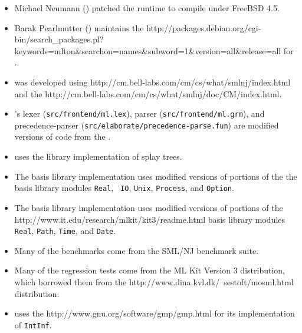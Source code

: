 \begin{itemize}
\item
Michael Neumann () patched the runtime to
compile under FreeBSD 4.5.

\item
Barak Pearlmutter () maintains the
		  {http://packages.debian.org/cgi-bin/search_packages.pl?keywords=mlton&searchon=names&subword=1&version=all&release=all}
for {\mlton}.

\item
{\mlton} was developed using
		  {http://cm.bell-labs.com/cm/cs/what/smlnj/index.html}
and the
		  {http://cm.bell-labs.com/cm/cs/what/smlnj/doc/CM/index.html}.

\item
{\mlton}'s lexer ({\tt src/frontend/ml.lex}), 
parser ({\tt src/frontend/ml.grm}),
and precedence-parser ({\tt src/elaborate/precedence-parse.fun})
are modified versions of code from the {\smlnj}.

\item
{\mlton} uses the {\smlnj} library implementation of splay trees.

\item
The {\mlton} basis library implementation uses modified versions of
portions of the the {\smlnj} basis library modules {\tt Real}, {\tt
IO}, {\tt Unix}, {\tt Process}, and {\tt Option}.

\item
The {\mlton} basis library implementation uses modified versions of
portions of the
		  {http://www.it.edu/research/mlkit/kit3/readme.html}
basis library modules {\tt Real}, {\tt Path}, {\tt Time}, and
{\tt Date}.

\item
Many of the benchmarks come from the SML/NJ benchmark suite.

\item
Many of the regression tests come from the ML Kit Version 3 distribution, which
borrowed them from the
		  {http://www.dina.kvl.dk/~sestoft/mosml.html}
distribution.

\item
{\mlton} uses the
		  {http://www.gnu.org/software/gmp/gmp.html}
for its implementation of {\tt IntInf}.


\end{itemize}
